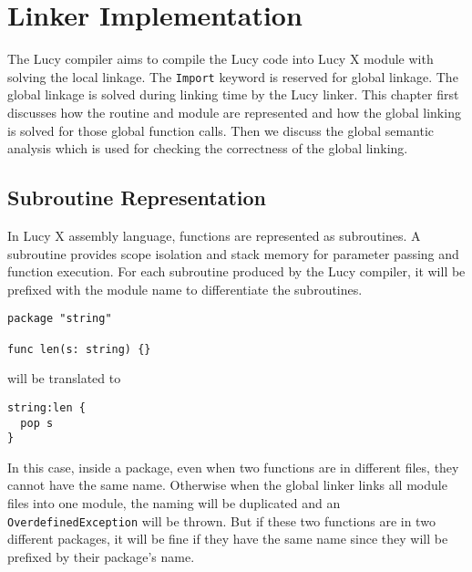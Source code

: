 \chapter{Linker Implementation}
The Lucy compiler aims to compile the Lucy code into Lucy X module with solving the local linkage. The \texttt{Import} keyword is reserved for global linkage. The global linkage is solved during linking time by the Lucy linker. This chapter first discusses how the routine and module are represented and how the global linking is solved for those global function calls. Then we discuss the global semantic analysis which is used for checking the correctness of the global linking.


\section{Subroutine Representation}
In Lucy X assembly language, functions are represented as subroutines. A subroutine provides scope isolation and stack memory for parameter passing and function execution. For each subroutine produced by the Lucy compiler, it will be prefixed with the module name to differentiate the subroutines.
\begin{lstlisting}
package "string"

func len(s: string) {}
\end{lstlisting}
will be translated to
\begin{lstlisting}[language=LucyX]
string:len {
  pop s
}
\end{lstlisting}
In this case, inside a package, even when two functions are in different files, they cannot have the same name. Otherwise when the global linker links all module files into one module, the naming will be duplicated and an \texttt{OverdefinedException} will be thrown. But if these two functions are in two different packages, it will be fine if they have the same name since they will be prefixed by their package's name.


